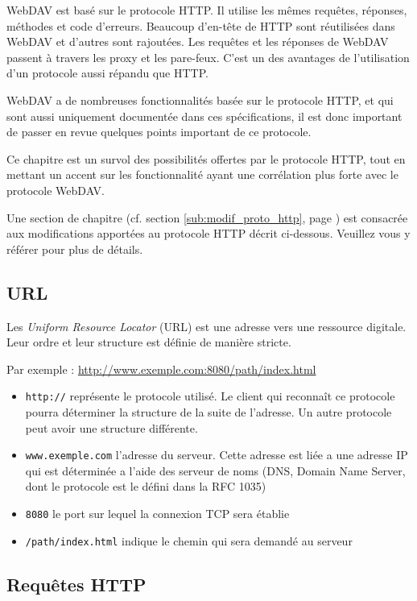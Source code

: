 \documentclass[a4paper, 11pt]{article}
\begin{document}
{WebDAV est basé sur le protocole HTTP. Il utilise les mêmes requêtes, réponses, méthodes et code d'erreurs. Beaucoup d'en-tête de HTTP sont réutilisées dans WebDAV et d'autres sont rajoutées. Les requêtes et les réponses de WebDAV passent à travers les proxy et les pare-feux. C'est un des avantages de l'utilisation d'un protocole aussi répandu que HTTP.

WebDAV a de nombreuses fonctionnalités basée sur le protocole HTTP, et qui sont aussi uniquement documentée dans ces spécifications, il est donc important de passer en revue quelques points important de ce protocole. 

Ce chapitre est un survol des possibilités offertes par le protocole HTTP, tout en mettant un accent sur les fonctionnalité ayant une corrélation plus forte avec le protocole WebDAV.

Une section de chapitre (cf. section \ref{sub:modif_proto_http}, page \pageref{sub:modif_proto_http}) est consacrée aux modifications apportées au protocole HTTP décrit ci-dessous. Veuillez vous y référer pour plus de détails.

	\subsection{URL}
	
		Les \emph{Uniform Resource Locator} (URL) est une adresse vers une ressource digitale. Leur ordre et leur structure est définie de manière stricte.
		
		Par exemple : \url{http://www.exemple.com:8080/path/index.html} 
		
		\begin{itemize}
			\item \verb$http://$ représente le protocole utilisé. Le client qui reconnaît ce protocole pourra déterminer la structure de la suite de l'adresse. Un autre protocole peut avoir une structure différente.
			\item \verb$www.exemple.com$ l'adresse du serveur. Cette adresse est liée a une adresse IP qui est déterminée a l'aide des serveur de noms (DNS, Domain Name Server, dont le protocole est le défini dans la RFC 1035)
			\item \verb$8080$ le port sur lequel la connexion TCP sera établie
			\item \verb$/path/index.html$ indique le chemin qui sera demandé au serveur
		\end{itemize}
		
	\subsection{Requêtes HTTP}
	
}
\end{document}
